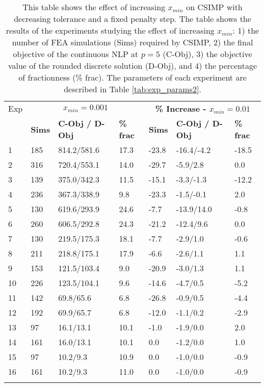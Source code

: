 \begin{table}
\centering
\tabcolsep=0.09cm
\caption{This table shows the effect of increasing $x_{min}$ on CSIMP with decreasing tolerance and a fixed penalty step. The table shows the results of the experiments studying the effect of increasing $x_{min}$: 1) the number of FEA simulations (Sims) required by CSIMP, 2) the final objective of the continuous NLP at $p = 5$ (C-Obj), 3) the objective value of the rounded discrete solution (D-Obj), and 4) the percentage of fractionness (\% frac). The parameters of each experiment are described in Table \ref{tab:exp_params2}.}
\label{tab:dec_tol_csimp_xmin}
\begin{tabular}{|l|l|l|l|l||l|l|}
\hline\noalign{\smallskip}
Exp & \multicolumn{3}{c||}{\textbf{$x_{min} = 0.001$}} & \multicolumn{3}{c|}{\textbf{\% Increase - $x_{min} = 0.01$}} \\
\noalign{\smallskip}\hline\noalign{\smallskip}
& \textbf{Sims} & \textbf{C-Obj / D-Obj} & \textbf{\% frac} & \textbf{Sims} & \textbf{C-Obj / D-Obj} & \textbf{\% frac}\\
\hline
1 & 185 & 814.2/581.6 & 17.3 & -23.8 & -16.4/-4.2 & -18.5 \\ 
\hline
2 &  316 & 720.4/553.1 & 14.0 & -29.7 & -5.9/2.8 & 0.0 \\ 
\hline
3 &  139 & 375.0/342.3 & 11.5 & -15.1 & -3.3/-1.3 & -12.2 \\ 
\hline
4 &  236 & 367.3/338.9 & 9.8 & -23.3 & -1.5/-0.1 & 2.0 \\ 
\hline
\hline
5 & 130 & 619.6/293.9 & 24.6 & -7.7 & -13.9/14.0 & -0.8 \\ 
\hline
6 & 260 & 606.5/292.8 & 24.3 & -21.2 & -12.4/9.6 & 0.0 \\ 
\hline
7 & 130 & 219.5/175.3 & 18.1 & -7.7 & -2.9/1.0 & -0.6 \\ 
\hline
8 & 211 & 218.8/175.1 & 17.9 & -6.6 & -2.6/1.1 & 1.1 \\ 
\hline
\hline
9 & 153 & 121.5/103.4 & 9.0 & -20.9 & -3.0/1.3 & 1.1 \\ 
\hline
10 & 226 & 123.5/104.1 & 9.6 & -14.6 & -4.7/0.5 & -5.2 \\ 
\hline
11 & 142 & 69.8/65.6 & 6.8 & -26.8 & -0.9/0.5 & -4.4 \\ 
\hline
12 & 192 & 69.9/65.7 & 6.8 & -12.0 & -1.1/0.2 & -2.9 \\ 
\hline
\hline
13 & 97 & 16.1/13.1 & 10.1 & -1.0 & -1.9/0.0 & 2.0 \\ 
\hline
14 & 161 & 16.0/13.1 & 10.1 & 0.0 & -1.2/0.0 & 1.0 \\ 
\hline
15 & 97 & 10.2/9.3 & 10.9 & 0.0 & -1.0/0.0 & -0.9 \\ 
\hline
16 & 161 & 10.2/9.3 & 11.0 & 0.0 & -1.0/0.0 & -0.9 \\ 
\hline
\noalign{\smallskip}\hline
\end{tabular}
\end{table}
